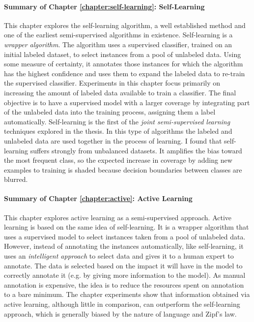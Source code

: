 \paragraph{Summary of Chapter \ref{chapter:self-learning}: Self-Learning}

This chapter explores the self-learning algorithm, a well established method
and one of the earliest semi-supervised algorithms in existence.  Self-learning
is a {\em wrapper algorithm}. The algorithm uses a supervised classifier,
trained on an initial labeled dataset, to select instances from a pool of
unlabeled data. Using some measure of certainty, it annotates those instances
for which the algorithm has the highest confidence and uses them to expand the
labeled data to re-train the supervised classifier. Experiments in this chapter
focus primarily on increasing the amount of labeled data available to train a
classifier. The final objective is to have a supervised model with a larger
coverage by integrating part of the unlabeled data into the training process,
assigning them a label automatically. Self-learning is the first of the {\em
joint semi-supervised learning} techniques explored in the thesis.  In this
type of algorithms the labeled and unlabeled data are used together in the
process of learning. I found that self-learning suffers strongly from
unbalanced datasets. It amplifies the bias toward the most frequent class, so
the expected increase in coverage by adding new examples to training is shaded
because decision boundaries between classes are blurred.

\paragraph{Summary of Chapter \ref{chapter:active}: Active Learning}

This chapter explores active learning as a semi-supervised approach. Active
learning is based on the same idea of self-learning. It is a wrapper algorithm
that uses a supervised model to select instances taken from a pool of unlabeled
data. However, instead of annotating the instances automatically, like
self-learning, it uses an {\em intelligent approach} to select data and gives
it to a human expert to annotate. The data is selected based on the impact it
will have in the model to correctly annotate it (e.g. by giving more
information to the model). As manual annotation is expensive, the idea is to
reduce the resources spent on annotation to a bare minimum. The chapter
experiments show that information obtained via active learning, although little
in comparison, can outperform the self-learning approach, which is generally
biased by the nature of language and Zipf's law.

